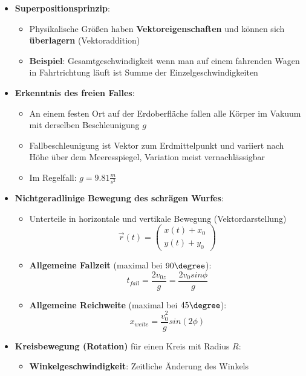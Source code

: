 \begin{itemize}
\begin{itemize}
	\end{itemize}
	\item \textbf{Superpositionsprinzip}:
	\begin{itemize}
		\item Physikalische Größen haben \textbf{Vektoreigenschaften} und können sich \textbf{überlagern} (Vektoraddition)
		\item \textbf{Beispiel}: Gesamtgeschwindigkeit wenn man auf einem fahrenden Wagen in Fahrtrichtung läuft ist Summe der Einzelgeschwindigkeiten
	\end{itemize}
	\item \textbf{Erkenntnis des freien Falles}:
	\begin{itemize}
		\item An einem festen Ort auf der Erdoberfläche fallen alle Körper im Vakuum mit derselben Beschleunigung $g$
		\item Fallbeschleunigung ist Vektor zum Erdmittelpunkt und variiert nach Höhe über dem Meeresspiegel, Variation meist vernachlässigbar
		\item Im Regelfall: $g = 9.81 \frac{m}{s^2}$
	\end{itemize}
	\newpage
	\item \textbf{Nichtgeradlinige Bewegung des schrägen Wurfes}:
	\begin{itemize}
		\item Unterteile in horizontale und vertikale Bewegung (Vektordarstellung)
		\begin{equation}
			\vec{r}(t) = \begin{pmatrix}
				x(t) + x_0\\
				y(t) + y_0
			\end{pmatrix}
		\end{equation}
		\item \textbf{Allgemeine Fallzeit} (maximal bei $90\degree$):
		\begin{equation}
			t_{fall} = \frac{2v_{0z}}{g} = \frac{2v_{0}sin\phi}{g}
		\end{equation}
		\item \textbf{Allgemeine Reichweite} (maximal bei $45\degree$):
		\begin{equation}
			x_{weite} = \frac{v_{0}^2}{g}sin(2\phi)
		\end{equation}
	\end{itemize}
	\item \textbf{Kreisbewegung (Rotation)} für einen Kreis mit Radius $R$:
	\begin{itemize}
		\item \textbf{Winkelgeschwindigkeit}: Zeitliche Änderung des Winkels

\end{itemize}
\end{itemize}
